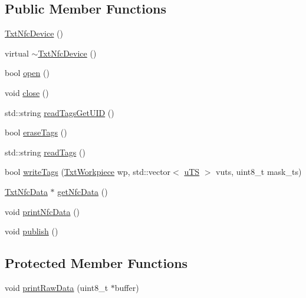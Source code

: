 \subsection*{Public Member Functions}
\begin{DoxyCompactItemize}
\item 
\hyperlink{classft_1_1_txt_nfc_device_ab5e9bb048da99db45ad5a666b2516887}{Txt\+Nfc\+Device} ()
\item 
virtual \hyperlink{classft_1_1_txt_nfc_device_a7b440f33260d269f870188cdb53f47e1}{$\sim$\+Txt\+Nfc\+Device} ()
\item 
bool \hyperlink{classft_1_1_txt_nfc_device_adfc7bf2b1fa487ed5af502d17b17c527}{open} ()
\item 
void \hyperlink{classft_1_1_txt_nfc_device_aec662a9e5128e5abee343bd8b9c09996}{close} ()
\item 
std\+::string \hyperlink{classft_1_1_txt_nfc_device_a49f1db0ef04655e2732f0726cc881abf}{read\+Tags\+Get\+U\+ID} ()
\item 
bool \hyperlink{classft_1_1_txt_nfc_device_adf81ce90e3613e8f17291fd6e3b5ed2e}{erase\+Tags} ()
\item 
std\+::string \hyperlink{classft_1_1_txt_nfc_device_a17f45d02a96db45a27aa82b6c5f48c24}{read\+Tags} ()
\item 
bool \hyperlink{classft_1_1_txt_nfc_device_abe33753d8d5ab511b6045b12399f1745}{write\+Tags} (\hyperlink{classft_1_1_txt_workpiece}{Txt\+Workpiece} wp, std\+::vector$<$ \hyperlink{namespaceft_a6b29d191a4ff3cd5738bcb38e4392811}{u\+TS} $>$ vuts, uint8\+\_\+t mask\+\_\+ts)
\item 
\hyperlink{classft_1_1_txt_nfc_data}{Txt\+Nfc\+Data} $\ast$ \hyperlink{classft_1_1_txt_nfc_device_ab7b821085cfb5459e7e234f25244d10d}{get\+Nfc\+Data} ()
\item 
void \hyperlink{classft_1_1_txt_nfc_device_aab6573c55e84cab2623d1eadd6f7cc28}{print\+Nfc\+Data} ()
\item 
void \hyperlink{classft_1_1_txt_nfc_device_ae7f154afa47b4e2010cd23e4b81a60b8}{publish} ()
\end{DoxyCompactItemize}
\subsection*{Protected Member Functions}
\begin{DoxyCompactItemize}
\item 
void \hyperlink{classft_1_1_txt_nfc_device_ad24e95c177354453f34ce9b4bae2bdb5}{print\+Raw\+Data} (uint8\+\_\+t $\ast$buffer)
\end{DoxyCompactItemize}
